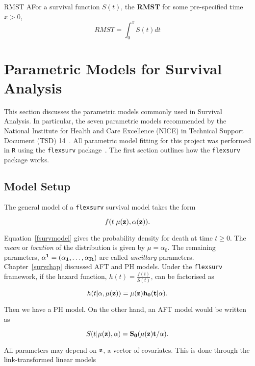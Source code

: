 \begin{definition}{RMST}
    AFor a survival function $S(t)$, the \textbf{RMST} for some pre-specified time $x > 0$,
    \[
        RMST = \int_{0}^{x} S(t)dt
    \] 
    \label{def:rmst}
\end{definition}

\section{Parametric Models for Survival Analysis}
This section discusses the parametric models commonly used in Survival Analysis. In particular, the seven parametric models recommended by the National Institute for Health and Care Excellence (NICE) in Technical Support Document (TSD) 14~\cite{tsd14}. All parametric model fitting for this project was performed in \verb|R| using the \verb|flexsurv| package~\cite{flexsurv}. The first section outlines how the \verb|flexsurv| package works.

\subsection{Model Setup}
The general model of a \verb|flexsurv| survival model takes the form 

\begin{equation}
    \label{fsurvmodel}
    f(t|\mu(\bf{z}), \bf{\alpha}(\bf{z})).
\end{equation}

Equation~\ref{fsurvmodel} gives the probability density for death at time $t \geq 0$. The \textit{mean} or \textit{location} of the distribution is given by $\mu = \alpha_0$. The remaining parameters, $\bf{\alpha^1} = (\alpha_1, \ldots, \alpha_R)$ are called \textit{ancillary} parameters. \\

Chapter~\ref{survchap} discussed AFT and PH models. Under the \verb|flexsurv| framework, if the hazard function, $h(t) = \frac{f(t)}{S(t)}$, can be factorised as 

\[
    h(t|\bf{\alpha}, \mu(\bf{z})) = \mu(\bf{z})h_0(t|\bf{\alpha}). 
\] 

Then we have a PH model. On the other hand, an AFT model would be written as

\[
    S(t|\mu(\bf{z}), \bf{\alpha}) = S_0(\mu(\bf{z})t/\bf{\alpha}).  
\]

All parameters may depend on $\bf{z}$, a vector of covariates. This is done through the link-transformed linear models

